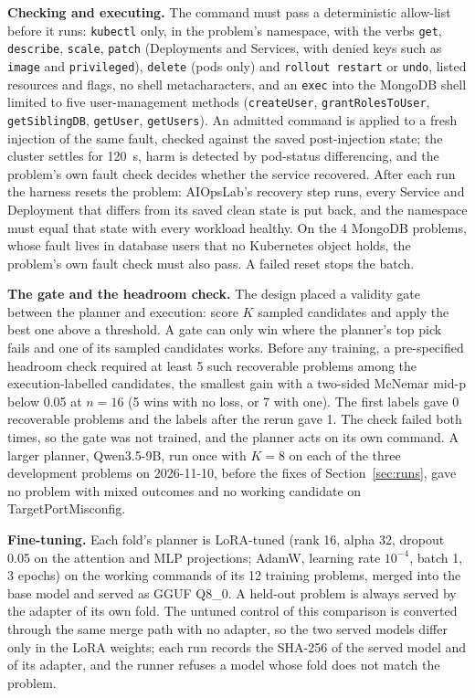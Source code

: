 \documentclass[10pt,conference]{IEEEtran}
\newcommand{\code}[1]{\texttt{\upshape #1}}
\begin{document}
\textbf{Checking and executing.} The command must pass a deterministic allow-list before it runs:
\code{kubectl} only, in the problem's namespace, with the verbs \code{get}, \code{describe},
\code{scale}, \code{patch} (Deployments and Services, with denied keys such as \code{image} and
\code{privileged}), \code{delete} (pods only) and \code{rollout restart} or \code{undo}, listed
resources and flags, no shell metacharacters, and an \code{exec} into the MongoDB shell limited to
five user-management methods (\code{createUser}, \code{grantRolesToUser}, \code{getSiblingDB},
\code{getUser}, \code{getUsers}). An admitted command is applied to a fresh injection of the same
fault, checked against the saved post-injection state; the cluster settles for 120~s, harm is
detected by pod-status differencing, and the problem's own fault check decides whether the service
recovered. After each run the harness resets the problem: AIOpsLab's recovery step runs, every
Service and Deployment that differs from its saved clean state is put back, and the namespace must
equal that state with every workload healthy. On the 4 MongoDB problems, whose fault lives in
database users that no Kubernetes object holds, the problem's own fault check must also pass. A
failed reset stops the batch.

\textbf{The gate and the headroom check.}
\label{sec:headroom}
The design placed a validity gate between the planner and execution: score $K$ sampled candidates
and apply the best one above a threshold. A gate can only win where the planner's top pick fails
and one of its sampled candidates works. Before any training, a pre-specified headroom check required at least 5 such recoverable
problems among the execution-labelled candidates, the smallest gain with a two-sided McNemar mid-p below 0.05 at
$n=16$ (5 wins with no loss, or 7 with one). The first labels gave 0 recoverable problems and the
labels after the rerun gave 1. The check failed both times, so the gate was not trained, and the
planner acts on its own command. A larger planner, Qwen3.5-9B, run once with $K=8$ on each of the
three development problems on 2026-11-10, before the fixes of Section~\ref{sec:runs}, gave no
problem with mixed outcomes and no working candidate on TargetPortMisconfig.

\textbf{Fine-tuning.} Each fold's planner is LoRA-tuned (rank 16, alpha 32, dropout 0.05 on the attention and MLP projections; AdamW,
learning rate $10^{-4}$, batch 1, 3 epochs) on the
working commands of its 12 training problems, merged into the base model and served as GGUF Q8\_0.
A held-out problem is always served by the adapter of its own fold. The untuned control of this
comparison is converted through the same merge path with no adapter, so the two served models
differ only in the LoRA weights; each run records the SHA-256 of the served model and of its
adapter, and the runner refuses a model whose fold does not match the problem.
\end{document}
